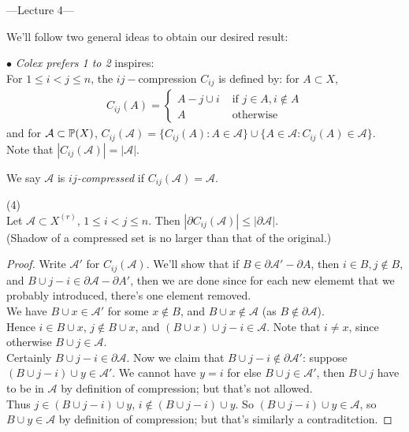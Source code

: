 \documentclass[a4paper]{article}
\begin{document}
---Lecture 4---

We'll follow two general ideas to obtain our desired result:

$\bullet$ \emph{Colex prefers 1 to 2} inspires:\\
For $1 \leq i < j \leq n$, the $ij-$compression $C_{ij}$ is defined by: for $A \subset X$,
\begin{equation*}
    \begin{aligned}
        C_{ij}(A) = \left\{
            \begin{array}{ll}
                A-j \cup i & \text{ if } j \in A, i \not\in A\\
                A & \text{ otherwise}
            \end{array}
        \right.
    \end{aligned}
\end{equation*}
and for $\mathcal{A} \subset \P(X)$, $C_{ij}(\mathcal{A}) = \{C_{ij}(A):A \in \mathcal{A}\} \cup \{A \in \mathcal{A}:C_{ij}(A) \in \mathcal{A}\}$.\\
Note that $|C_{ij}(\mathcal{A})| = |\mathcal{A}|$.

We say $\mathcal{A}$ is \emph{$ij$-compressed} if $C_{ij}(\mathcal{A}) = \mathcal{A}$.

\begin{prop} (4)\\
    Let $\mathcal{A} \subset X^{(r)}$, $1 \leq i < j \leq n$. Then $|\partial C_{ij}(\mathcal{A}) | \leq |\partial \mathcal{A}|$.\\
    (Shadow of a compressed set is no larger than that of the original.)
    \begin{proof}
        Write $\mathcal{A'}$ for $C_{ij}(\mathcal{A})$. We'll show that if $B \in \partial \mathcal{A}' - \partial A$, then $i \in B, j \not \in B$, and $B \cup j - i \in \partial \mathcal{A} - \partial{A'}$, then we are done since for each new elememt that we probably introduced, there's one element removed.\\
        We have $B \cup x \in \mathcal{A}'$ for some $x \not\in B$, and $B \cup x \not\in \mathcal{A}$ (as $B \not\in \partial \mathcal{A}$).\\
        Hence $i \in B \cup x$, $j \not\in B \cup x$, and $(B \cup x ) \cup j - i \in \mathcal{A}$. Note that $i \neq x$, since otherwise $B \cup j \in \mathcal{A}$.\\
        Certainly $B \cup j - i \in \partial \mathcal{A}$. Now we claim that $B \cup j - i \not\in \partial \mathcal{A}'$: suppose $(B \cup j - i) \cup y \in \mathcal{A}'$. We cannot have $y=i$ for else $B \cup j \in \mathcal{A}'$, then $B\cup j$ have to be in $\mathcal{A}$ by definition of compression; but that's not allowed.\\
        Thus $j \in (B\cup j - i) \cup y$, $i \not\in (B \cup j - i) \cup y$. So $(B \cup j - i) \cup y \in \mathcal{A}$, so $B \cup y \in \mathcal{A}$ by definition of compression; but that's similarly a contraditction.
    \end{proof}
\end{prop}
\end{document}
